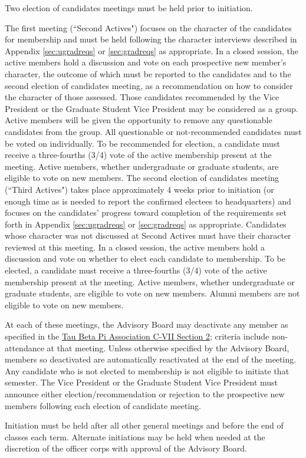 \begin{enumsubsection}
\itemnotoc Two election of candidates meetings must be held prior to initiation.
\begin{enumsubsubsection}
\itemnotoc The first meeting (``Second Actives") focuses on the character of the candidates for membership and must be held following the character interviews described in Appendix \ref{sec:ugradreqs} or \ref{sec:gradreqs} as appropriate.
In a closed session, the active members hold a discussion and vote on each prospective new member's character, the outcome of which must be reported to the candidates and to the second election of candidates meeting, as a recommendation on how to consider the character of those assessed.
Those candidates recommended by the Vice President or the Graduate Student Vice President may be considered as a group.
Active members will be given the opportunity to remove any questionable candidates from the group.
All questionable or not-recommended candidates must be voted on individually.
To be recommended for election, a candidate must receive a three-fourths (3/4) vote of the active membership present at the meeting.
Active members, whether undergraduate or graduate students, are eligible to vote on new members.
\itemnotoc The second election of candidates meeting (``Third Actives") takes place approximately 4 weeks prior to initiation (or enough time as is needed to report the confirmed electees to headquarters) and focuses on the candidates' progress toward completion of the requirements set forth in Appendix \ref{sec:ugradreqs} or \ref{sec:gradreqs} as appropriate.
Candidates whose character was not discussed at Second Actives must have their character reviewed at this meeting.
In a closed session, the active members hold a discussion and vote on whether to elect each candidate to membership.
To be elected, a candidate must receive a three-fourths (3/4) vote of the active membership present at the meeting.
Active members, whether undergraduate or graduate students, are eligible to vote on new members.
Alumni members are not eligible to vote on new members.
\end{enumsubsubsection}
At each of these meetings, the Advisory Board may deactivate any member as specified in the \href{http://www.tbp.org/off/ConstBylaw.pdf}{Tau Beta Pi Association C-VII Section 2}; criteria include non-attendance at that meeting.
Unless otherwise specified by the Advisory Board, members so deactivated are automatically reactivated at the end of the meeting.
\itemnotoc Any candidate who is not elected to membership is not eligible to initiate that semester.
\itemnotoc The Vice President or the Graduate Student Vice President must announce either election/recommendation or rejection to the prospective new members following each election of candidate meeting.

\itemnotoc Initiation must be held after all other general meetings and before the end of classes each term.
Alternate initiations may be held when needed at the discretion of the officer corps with approval of the Advisory Board.
\end{enumsubsection}
